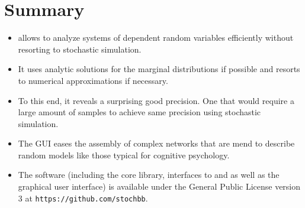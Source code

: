 \section{Summary}
\begin{itemize}
 \item {} allows to analyze systems of dependent random variables efficiently without resorting to stochastic simulation.
 \item It uses analytic solutions for the marginal distributions if possible and resorts to numerical approximations if necessary.
 \item To this end, it reveals a surprising good precision. One that would require a large amount of samples to achieve same precision using stochastic simulation.
 \item The GUI eases the assembly of complex networks that are mend to describe random models like those typical for cognitive psychology.
 \item The software (including the core library, interfaces to  and  as well as the graphical user interface) is available under the General Public License version 3 at \texttt{https://github.com/stochbb}. 
\end{itemize}